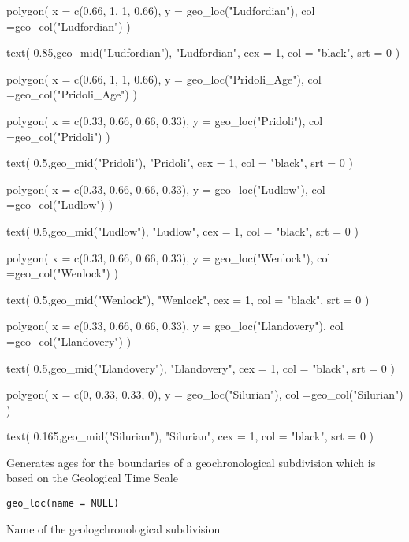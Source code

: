 \documentclass[a4paper]{book}
\begin{document}
\begin{Examples}
\begin{ExampleCode}
polygon(
 x = c(0.66, 1, 1, 0.66),
 y = geo_loc("Ludfordian"),
 col =geo_col("Ludfordian")
)

text(
 0.85,geo_mid("Ludfordian"),
 "Ludfordian",
 cex = 1,
 col = "black",
 srt = 0
)

polygon(
 x = c(0.66, 1, 1, 0.66),
 y = geo_loc("Pridoli_Age"),
 col =geo_col("Pridoli_Age")
)



polygon(
 x = c(0.33, 0.66, 0.66, 0.33),
 y = geo_loc("Pridoli"),
 col =geo_col("Pridoli")
)

text(
 0.5,geo_mid("Pridoli"),
 "Pridoli",
 cex = 1,
 col = "black",
 srt = 0
)


polygon(
 x = c(0.33, 0.66, 0.66, 0.33),
 y = geo_loc("Ludlow"),
 col =geo_col("Ludlow")
)

text(
 0.5,geo_mid("Ludlow"),
 "Ludlow",
 cex = 1,
 col = "black",
 srt = 0
)

polygon(
 x = c(0.33, 0.66, 0.66, 0.33),
 y = geo_loc("Wenlock"),
 col =geo_col("Wenlock")
)

text(
 0.5,geo_mid("Wenlock"),
 "Wenlock",
 cex = 1,
 col = "black",
 srt = 0
)

polygon(
 x = c(0.33, 0.66, 0.66, 0.33),
 y = geo_loc("Llandovery"),
 col =geo_col("Llandovery")
)

text(
 0.5,geo_mid("Llandovery"),
 "Llandovery",
 cex = 1,
 col = "black",
 srt = 0
)

polygon(
 x = c(0, 0.33, 0.33, 0),
 y = geo_loc("Silurian"),
 col =geo_col("Silurian")
)

text(
 0.165,geo_mid("Silurian"),
 "Silurian",
 cex = 1,
 col = "black",
 srt = 0
)


\end{ExampleCode}
\end{Examples}
%
\begin{Description}
Generates  ages for the boundaries of a
geochronological subdivision which is based on the Geological Time Scale
\end{Description}
%
\begin{Usage}
\begin{verbatim}
geo_loc(name = NULL)
\end{verbatim}
\end{Usage}
%
\begin{Arguments}
\begin{ldescription}
\item[\code{name}] Name of the geologchronological subdivision
\end{ldescription}
\end{Arguments}
\end{document}

